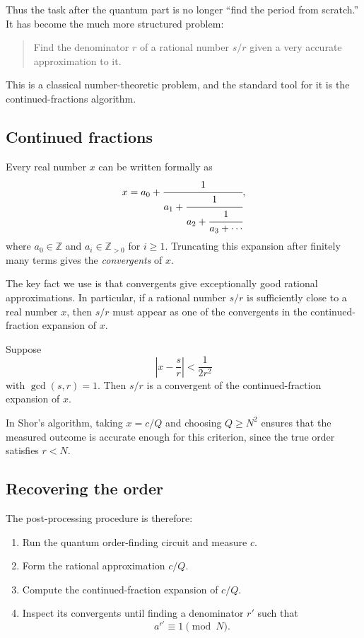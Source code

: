 Thus the task after the quantum part is no longer ``find the period from scratch.'' It has become the much more structured problem:
\begin{quote}
Find the denominator $r$ of a rational number $s/r$ given a very accurate approximation to it.
\end{quote}
This is a classical number-theoretic problem, and the standard tool for it is the continued-fractions algorithm.

\subsection{Continued fractions}

\begin{definition}
Every real number $x$ can be written formally as
\[
    x = a_0 + \cfrac{1}{a_1 + \cfrac{1}{a_2 + \cfrac{1}{a_3 + \cdots}}},
\]
where $a_0 \in \mathbb{Z}$ and $a_i \in \mathbb{Z}_{>0}$ for $i \geq 1$. Truncating this expansion after finitely many terms gives the \emph{convergents} of $x$.
\end{definition}

The key fact we use is that convergents give exceptionally good rational approximations. In particular, if a rational number $s/r$ is sufficiently close to a real number $x$, then $s/r$ must appear as one of the convergents in the continued-fraction expansion of $x$.

\begin{theorem}
\label{thm:cf-criterion}
Suppose
\[
    \left|x - \frac{s}{r}\right| < \frac{1}{2r^2}
\]
with $\gcd(s,r)=1$. Then $s/r$ is a convergent of the continued-fraction expansion of $x$.
\end{theorem}

In Shor's algorithm, taking $x=c/Q$ and choosing $Q \geq N^2$ ensures that the measured outcome is accurate enough for this criterion, since the true order satisfies $r < N$.

\subsection{Recovering the order}

The post-processing procedure is therefore:
\begin{enumerate}
    \item Run the quantum order-finding circuit and measure $c$.
    \item Form the rational approximation $c/Q$.
    \item Compute the continued-fraction expansion of $c/Q$.
    \item Inspect its convergents until finding a denominator $r'$ such that
    \[
        a^{r'} \equiv 1 \pmod N.
    \]
\end{enumerate}

